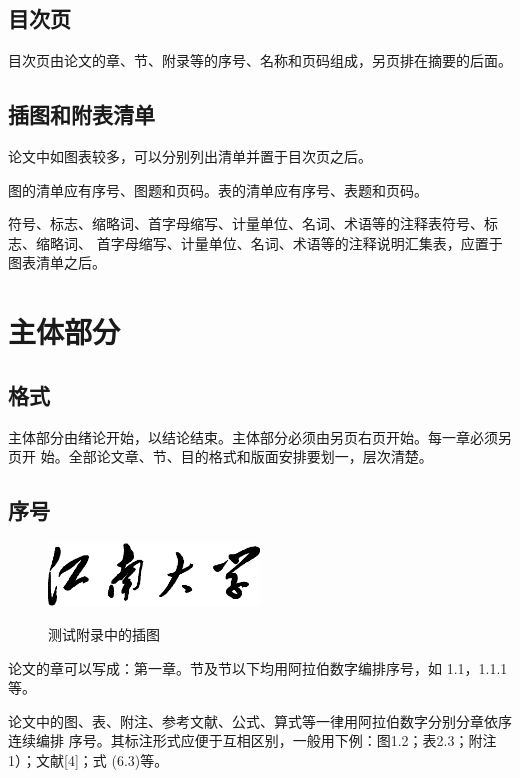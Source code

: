 \documentclass[phd]{jnuthesis}
\begin{document}
\subsection{目次页}

目次页由论文的章、节、附录等的序号、名称和页码组成，另页排在摘要的后面。

\subsection{插图和附表清单}

论文中如图表较多，可以分别列出清单并置于目次页之后。

图的清单应有序号、图题和页码。表的清单应有序号、表题和页码。

符号、标志、缩略词、首字母缩写、计量单位、名词、术语等的注释表符号、标志、缩略词、
首字母缩写、计量单位、名词、术语等的注释说明汇集表，应置于图表清单之后。

\section{主体部分}

\subsection{格式}

主体部分由绪论开始，以结论结束。主体部分必须由另页右页开始。每一章必须另页开
始。全部论文章、节、目的格式和版面安排要划一，层次清楚。

\subsection{序号}

\begin{figure}[htbp]
  \centering
  \includegraphics[width= 0.5\textwidth]{jnuname.eps}\\
  \caption{测试附录中的插图}\label{fig:appendix1}
\end{figure}

论文的章可以写成：第一章。节及节以下均用阿拉伯数字编排序号，如
1.1，1.1.1等。

论文中的图、表、附注、参考文献、公式、算式等一律用阿拉伯数字分别分章依序连续编排
序号。其标注形式应便于互相区别，一般用下例：图1.2；表2.3；附注1）；文献[4]；式
  (6.3)等。
\end{document}
